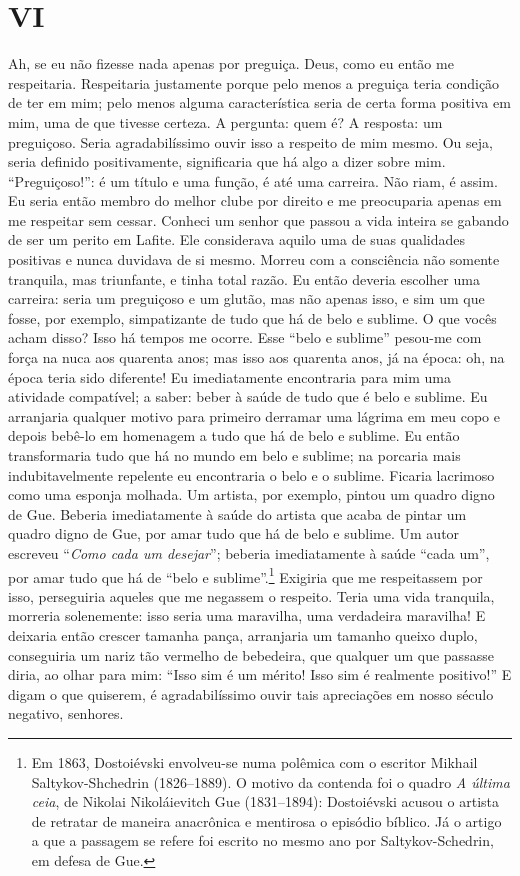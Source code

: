\section{VI}

Ah, se eu não fizesse nada apenas por preguiça. Deus, como eu então me
respeitaria. Respeitaria justamente porque pelo menos a preguiça teria condição
de ter em mim; pelo menos alguma característica seria de certa forma positiva
em mim, uma de que tivesse certeza. A pergunta: quem é?  A resposta: um
preguiçoso. Seria agradabilíssimo ouvir isso a respeito de mim mesmo. Ou seja,
seria definido positivamente, significaria que há algo a dizer sobre mim.
“Preguiçoso!”: é um título e uma função, é até uma carreira. Não riam, é assim.
Eu seria então membro do melhor clube por direito e me preocuparia apenas em me
respeitar sem cessar.  Conheci um senhor que passou a vida inteira se gabando
de ser um perito em Lafite. Ele considerava aquilo uma de suas qualidades
positivas e nunca duvidava de si mesmo. Morreu com a consciência não somente
tranquila, mas triunfante, e tinha total razão. Eu então deveria escolher uma
carreira: seria um preguiçoso e um glutão, mas não apenas isso, e sim um que
fosse, por exemplo, simpatizante de tudo que há de belo e sublime. O que vocês
acham disso? Isso há tempos me ocorre. Esse “belo e sublime” pesou-me com força
na nuca aos quarenta anos; mas isso aos quarenta anos, já na época: oh, na
época teria sido diferente! Eu imediatamente encontraria para mim uma atividade
compatível; a saber: beber à saúde de tudo que é belo e sublime. Eu arranjaria
qualquer motivo para primeiro derramar uma lágrima em meu copo e depois bebê-lo
em homenagem a tudo que há de belo e sublime. Eu então transformaria tudo que
há no mundo em belo e sublime; na porcaria mais indubitavelmente repelente eu
encontraria o belo e o sublime. Ficaria lacrimoso como uma esponja molhada. Um
artista, por exemplo, pintou um quadro digno de Gue. Beberia imediatamente à
saúde do artista que acaba de pintar um quadro digno de Gue, por amar tudo que
há de belo e sublime. Um autor escreveu “\textit{Como cada um desejar}”;
beberia imediatamente à saúde “cada um”, por amar tudo que há de “belo e
sublime”.\footnote{ Em 1863, Dostoiévski envolveu-se numa polêmica com o
escritor Mikhail Saltykov-Shchedrin (1826--1889). O motivo da contenda foi o
quadro \textit{A última ceia}, de Nikolai Nikoláievitch Gue (1831--1894):
Dostoiévski acusou o artista de retratar de maneira anacrônica e mentirosa o
episódio bíblico. Já o artigo a que a passagem se refere foi escrito no mesmo
ano por Saltykov-Schedrin, em defesa de Gue.} Exigiria que me respeitassem por
isso, perseguiria aqueles que me negassem o respeito.  Teria uma vida
tranquila, morreria solenemente: isso seria uma maravilha, uma verdadeira
maravilha! E deixaria então crescer tamanha pança, arranjaria um tamanho queixo
duplo, conseguiria um nariz tão vermelho de bebedeira, que qualquer um que
passasse diria, ao olhar para mim: “Isso sim é um mérito! Isso sim é realmente
positivo!” E digam o que quiserem, é agradabilíssimo ouvir tais apreciações em
nosso século negativo, senhores.


